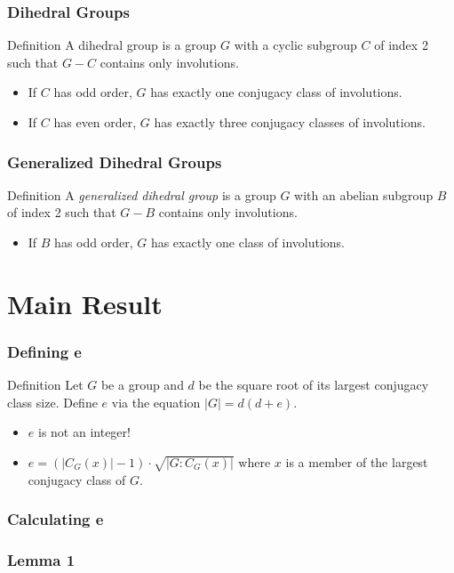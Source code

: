 \documentclass{beamer}
\begin{document}
\begin{frame}
\frametitle{Dihedral Groups}
\begin{block}{Definition}
A dihedral group is a group $G$ with a cyclic subgroup $C$ of index 2 such that $G - C$ contains only involutions.
\end{block}
\begin{itemize}
	\item If $C$ has odd order, $G$ has exactly one conjugacy class of involutions.
	\item If $C$ has even order, $G$ has exactly three conjugacy classes of involutions.
\end{itemize}
\end{frame}

\begin{frame}
\frametitle{Generalized Dihedral Groups}
\begin{block}{Definition}
A \emph{generalized dihedral group} is a group $G$ with an abelian subgroup $B$ of index 2 such that $G - B$ contains only involutions.
\end{block}
\begin{itemize}
	\item If $B$ has odd order, $G$ has exactly one class of involutions.
\end{itemize}
\end{frame}


\section{Main Result}

\begin{frame}
\frametitle{Defining e}
\begin{block}{Definition}
Let $G$ be a group and $d$ be the square root of its largest conjugacy class size. Define $e$ via the equation $|G| = d(d + e)$.
\end{block}
\begin{itemize}
	\item $e$ is not an integer!
	\item $e = (|C_G(x)| - 1) \cdot \sqrt{|G : C_G(x)|}$ where $x$ is a member of the largest conjugacy class of $G$.
\end{itemize}
\end{frame}

\begin{frame}
\frametitle{Calculating e}
\end{frame}

\begin{frame}
\frametitle{Lemma 1}
\end{frame}
\end{document}
